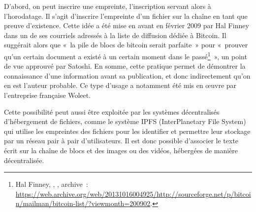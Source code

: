 D'abord, on peut inscrire une empreinte, l'inscription servant alors à l'horodatage. Il s'agit d'inscrire l'empreinte d'un fichier sur la chaîne en tant que preuve d'existence. Cette idée a été mise en avant en février 2009 par Hal Finney dans un de ses courriels adressés à la liste de diffusion dédiée à Bitcoin. Il suggérait alors que «~la pile de blocs de bitcoin serait parfaite~» pour «~prouver qu'un certain document a existé à un certain moment dans le passé\footnote{Hal Finney, , , archive~: \url{https://web.archive.org/web/20131016004925/http://sourceforge.net/p/bitcoin/mailman/bitcoin-list/?viewmonth=200902}.}~», un point de vue approuvé par Satoshi. En somme, cette pratique permet de démontrer la connaissance d'une information avant sa publication, et donc indirectement qu'on en est l'auteur probable. Ce type d'usage a notamment été mis en œuvre par l'entreprise française Woleet. %

Cette possibilité peut aussi être exploitée par les systèmes décentralisés d'hébergement de fichiers, comme le système IPFS (InterPlanetary File System) qui utilise les empreintes des fichiers pour les identifier et permettre leur stockage par un réseau pair à pair d'utilisateurs. Il est donc possible d'associer le texte écrit sur la chaîne de blocs et des images ou des vidéos, hébergées de manière décentralisée.

